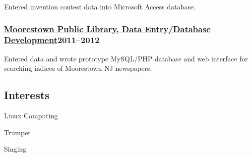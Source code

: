 \documentclass[lettersize,12pt,]{article}
\begin{document}
\begin{compactitem}
\itemsep1pt\parskip0pt

\item Entered invention contest data into Microsoft Access database.

\end{compactitem}



\subsubsection{\href{http://www.moorestown.lib.nj.us/}{Moorestown Public Library, Data Entry/Database Development}\hfill 2011--2012}



\begin{compactitem}
\itemsep1pt\parskip0pt

\item Entered data and wrote prototype MySQL/PHP database and web interface for searching indices of Moorestown NJ newspapers.

\end{compactitem}





\subsection{Interests}\label{interests}
\begin{compactitem}

\item Linux Computing 

\item Trumpet 

\item Singing 

\end{compactitem}
\end{document}
